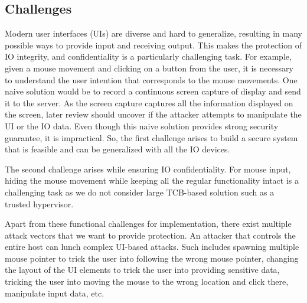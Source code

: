 \subsection{Challenges}


Modern user interfaces (UIs) are diverse and hard to generalize, resulting in many possible ways to provide input and receiving output.  This makes the protection of IO integrity, and confidentiality is a particularly challenging task. For example, given a mouse movement and clicking on a button from the user, it is necessary to understand the user intention that corresponds to the mouse movements. One naive solution would be to record a continuous screen capture of display and send it to the server. As the screen capture captures all the information displayed on the screen, later review should uncover if the attacker attempts to manipulate the UI or the IO data. Even though this naive solution provides strong security guarantee, it is impractical. So, the first challenge arises to build a secure system that is feasible and can be generalized with all the IO devices.   

The second challenge arises while ensuring IO confidentiality. For mouse input, hiding the mouse movement while keeping all the regular functionality intact is a challenging task as we do not consider large TCB-based solution such as a trusted hypervisor.


Apart from these functional challenges for implementation, there exist multiple attack vectors that we want to provide protection. An attacker that controls the entire host can lunch complex UI-based attacks. Such includes spawning multiple mouse pointer to trick the user into following the wrong mouse pointer, changing the layout of the UI elements to trick the user into providing sensitive data, tricking the user into moving the mouse to the wrong location and click there, manipulate input data, etc.





